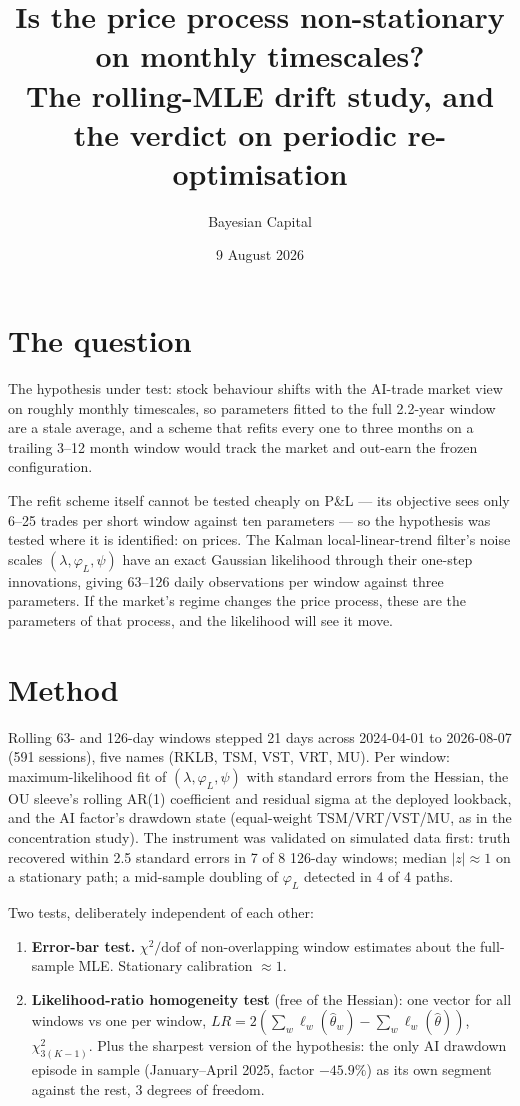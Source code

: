 \documentclass[11pt,a4paper]{article}
\title{Is the price process non-stationary on monthly timescales?\\
\large The rolling-MLE drift study, and the verdict on periodic re-optimisation}
\author{Bayesian Capital}
\date{9 August 2026}
\begin{document}
\maketitle

\section*{The question}

The hypothesis under test: stock behaviour shifts with the AI-trade market view on
roughly monthly timescales, so parameters fitted to the full 2.2-year window are a stale
average, and a scheme that refits every one to three months on a trailing 3--12 month
window would track the market and out-earn the frozen configuration.

The refit scheme itself cannot be tested cheaply on P\&L --- its objective sees only
6--25 trades per short window against ten parameters --- so the hypothesis was tested
where it is identified: on prices. The Kalman local-linear-trend filter's noise scales
$(\lambda, \varphi_L, \psi)$ have an exact Gaussian likelihood through their one-step
innovations, giving 63--126 daily observations per window against three parameters.
If the market's regime changes the price process, these are the parameters of that
process, and the likelihood will see it move.

\section*{Method}

Rolling 63- and 126-day windows stepped 21 days across 2024-04-01 to 2026-08-07
(591 sessions), five names (RKLB, TSM, VST, VRT, MU). Per window: maximum-likelihood
fit of $(\lambda, \varphi_L, \psi)$ with standard errors from the Hessian, the OU
sleeve's rolling AR(1) coefficient and residual sigma at the deployed lookback, and
the AI factor's drawdown state (equal-weight TSM/VRT/VST/MU, as in the concentration
study). The instrument was validated on simulated data first: truth recovered within
2.5 standard errors in 7 of 8 126-day windows; median $|z|\approx 1$ on a stationary
path; a mid-sample doubling of $\varphi_L$ detected in 4 of 4 paths.

Two tests, deliberately independent of each other:
\begin{enumerate}
  \item \textbf{Error-bar test.} $\chi^2/\mathrm{dof}$ of non-overlapping window
        estimates about the full-sample MLE. Stationary calibration $\approx 1$.
  \item \textbf{Likelihood-ratio homogeneity test} (free of the Hessian): one vector
        for all windows vs one per window, $LR = 2(\sum_w \ell_w(\hat\theta_w) -
        \sum_w \ell_w(\hat\theta))$, $\chi^2_{3(K-1)}$. Plus the sharpest version of
        the hypothesis: the only AI drawdown episode in sample (January--April 2025,
        factor $-45.9\%$) as its own segment against the rest, 3 degrees of freedom.
\end{enumerate}
\end{document}
